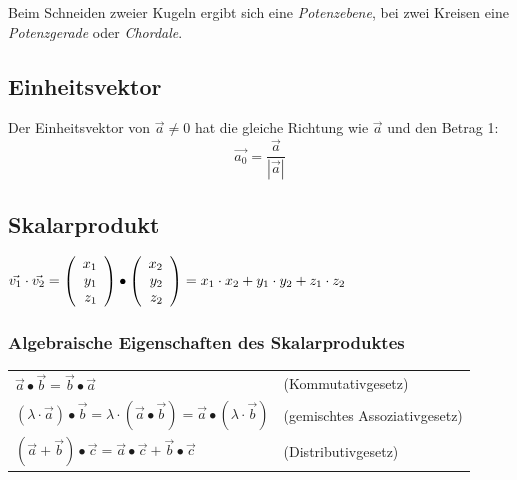 		Beim Schneiden zweier Kugeln ergibt sich eine \textit{Potenzebene}, bei zwei Kreisen eine
		\textit{Potenzgerade} oder \textit{Chordale}.



\subsection{Einheitsvektor}
	Der Einheitsvektor von $\vec{a} \neq 0$ hat die gleiche Richtung wie $\vec{a}$ und den Betrag 1:
	\begin{equation*}
		\vec{a_0} = \frac{\vec{a}}{|\vec{a}|}
	\end{equation*}

\subsection{Skalarprodukt}
	$\vec{v_1} \cdot \vec{v_2} = \left(\begin{array}{r} x_1 \\ y_1 \\ z_1 \\ \end{array}\right) \bullet \left(\begin{array}{r} x_2 \\ y_2 \\ z_2 \\ \end{array}\right)= x_1\cdot x_2 + y_1\cdot y_2 + z_1\cdot z_2$
	
	\subsubsection{Algebraische Eigenschaften des Skalarproduktes}
		\begin{tabular}{ll}
			$\vec{a} \bullet \vec{b} = \vec{b} \bullet \vec{a}$ & (Kommutativgesetz)\\
			$(\lambda \cdot \vec{a}) \bullet \vec{b} = \lambda \cdot (\vec{a} \bullet \vec{b}) = \vec{a} \bullet (\lambda \cdot \vec{b})$ & (gemischtes Assoziativgesetz)\\
			$(\vec{a} + \vec{b}) \bullet \vec{c} = \vec{a} \bullet \vec{c} + \vec{b} \bullet \vec{c}$ & (Distributivgesetz)
		\end{tabular}


